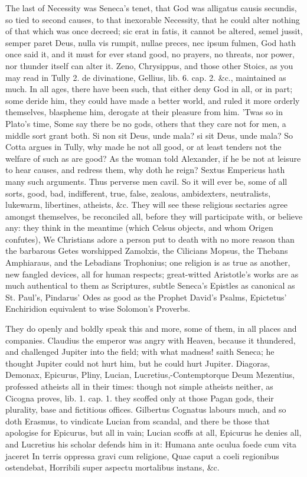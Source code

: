 {The last of Necessity was Seneca's tenet, that God was alligatus causis
secundis, so tied to second causes, to that inexorable Necessity, that
he could alter nothing of that which was once decreed; sic erat in
fatis, it cannot be altered, semel jussit, semper paret Deus, nulla vis
rumpit, nullae preces, nec ipsum fulmen, God hath once said it, and it
must for ever stand good, no prayers, no threats, nor power, nor
thunder itself can alter it. Zeno, Chrysippus, and those other Stoics,
as you may read in Tully 2. de divinatione, Gellius, lib. 6. cap. 2.
\&c., maintained as much. In all ages, there have been such, that either
deny God in all, or in part; some deride him, they could have made a
better world, and ruled it more orderly themselves, blaspheme him,
derogate at their pleasure from him. 'Twas so in Plato's time,
Some say there be no gods, others that they care not for men, a middle
sort grant both. Si non sit Deus, unde mala? si sit Deus, unde mala? So
Cotta argues in Tully, why made he not all good, or at least tenders
not the welfare of such as are good? As the woman told Alexander, if he
be not at leisure to hear causes, and redress them, why doth he reign?
Sextus Empericus hath many such arguments. Thus perverse men
cavil. So it will ever be, some of all sorts, good, bad, indifferent,
true, false, zealous, ambidexters, neutralists, lukewarm, libertines,
atheists, \&c. They will see these religious sectaries agree amongst
themselves, be reconciled all, before they will participate with, or
believe any: they think in the meantime (which Celsus objects,
and whom Origen confutes), We Christians adore a person put to
death with no more reason than the barbarous Getes worshipped
Zamolxis, the Cilicians Mopsus, the Thebans Amphiaraus, and the
Lebadians Trophonius; one religion is as true as another, new fangled
devices, all for human respects; great-witted Aristotle's works are as
much authentical to them as Scriptures, subtle Seneca's Epistles as
canonical as St. Paul's, Pindarus' Odes as good as the Prophet David's
Psalms, Epictetus' Enchiridion equivalent to wise Solomon's Proverbs.

They do openly and boldly speak this and more, some of them, in all
places and companies. Claudius the emperor was angry with Heaven,
because it thundered, and challenged Jupiter into the field; with what
madness! saith Seneca; he thought Jupiter could not hurt him, but he
could hurt Jupiter. Diagoras, Demonax, Epicurus, Pliny, Lucian,
Lucretius,-Contemptorque Deum Mezentius, professed atheists all in
their times: though not simple atheists neither, as Cicogna proves,
lib. 1. cap. 1. they scoffed only at those Pagan gods, their plurality,
base and fictitious offices. Gilbertus Cognatus labours much, and so
doth Erasmus, to vindicate Lucian from scandal, and there be those that
apologise for Epicurus, but all in vain; Lucian scoffs at all, Epicurus
he denies all, and Lucretius his scholar defends him in it:
Humana ante oculua foede cum vita jaceret
In terris oppressa gravi cum religione,
Quae caput a coeli regionibus ostendebat,
Horribili super aspectu mortalibus instans, \&c.

}
